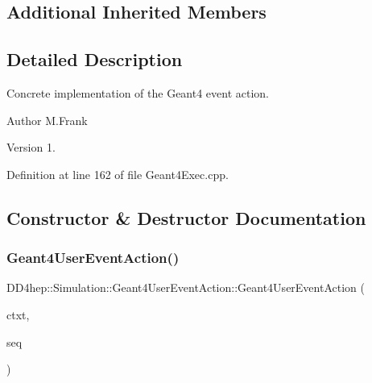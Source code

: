 \subsection*{Additional Inherited Members}


\subsection{Detailed Description}
Concrete implementation of the Geant4 event action. 

\begin{DoxyAuthor}{Author}
M.\+Frank 
\end{DoxyAuthor}
\begin{DoxyVersion}{Version}
1. 
\end{DoxyVersion}


Definition at line 162 of file Geant4\+Exec.\+cpp.



\subsection{Constructor \& Destructor Documentation}
\hypertarget{class_d_d4hep_1_1_simulation_1_1_geant4_user_event_action_a5d519de614318d3277d06587b93bde92}{}\label{class_d_d4hep_1_1_simulation_1_1_geant4_user_event_action_a5d519de614318d3277d06587b93bde92} 
\subsubsection{\texorpdfstring{Geant4\+User\+Event\+Action()}{Geant4UserEventAction()}}
{\footnotesize\ttfamily D\+D4hep\+::\+Simulation\+::\+Geant4\+User\+Event\+Action\+::\+Geant4\+User\+Event\+Action (\begin{DoxyParamCaption}\item[{\hyperlink{class_d_d4hep_1_1_simulation_1_1_geant4_context}{Geant4\+Context} $\ast$}]{ctxt,  }\item[{\hyperlink{class_d_d4hep_1_1_simulation_1_1_geant4_event_action_sequence}{Geant4\+Event\+Action\+Sequence} $\ast$}]{seq }\end{DoxyParamCaption})\hspace{0.3cm}{\ttfamily [inline]}}



